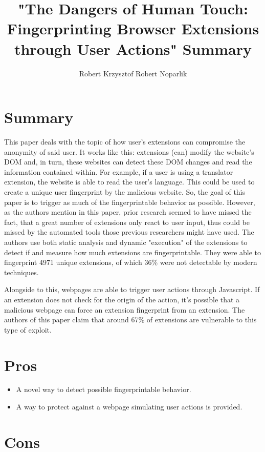 \documentclass{article}
\title{"The Dangers of Human Touch:
Fingerprinting Browser Extensions through User Actions" Summary}
\author{Robert Krzysztof Robert Noparlik}
\begin{document}
\maketitle

\section{Summary}

This paper deals with the topic of how user's extensions can compromise the anonymity of said user. It works like this: extensions (can) modify the website's DOM and, in turn, these websites can detect these DOM changes and read the information contained within. For example, if a user is using a translator extension, the website is able to read the user's language. This could be used to create a unique user fingerprint by the malicious website. So, the goal of this paper is to trigger as much of the fingerprintable behavior as possible.  However, as the authors mention in this paper, prior research seemed to have missed the fact, that a great number of extensions only react to user input, thus could be missed by the automated tools those previous researchers might have used. The authors use both static analysis and dynamic "execution" of the extensions to detect if and measure how much extensions are fingerprintable. They were able to fingerprint 4971 unique extensions, of which 36\% were not detectable by modern techniques.

Alongside to this, webpages are able to trigger user actions through Javascript. If an extension does not check for the origin of the action, it's possible that a malicious webpage can force an extension fingerprint from an extension. The authors of this paper claim that around 67\% of extensions are vulnerable to this type of exploit.

\section{Pros}

\begin{itemize}
\item A novel way to detect possible fingerprintable behavior.
\item A way to protect against a webpage simulating user actions is provided.
\end{itemize}

\section{Cons}
\end{document}
